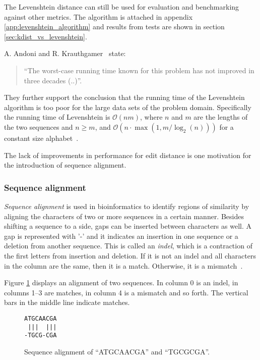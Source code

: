 The Levenshtein distance can still be used for evaluation and benchmarking
against other metrics. The algorithm is attached in appendix
\ref{app:levenshtein_algorithm} and results from tests are shown in section
\ref{sec:kdist_vs_levenshtein}.

A. Andoni and R. Krauthgamer~\cite[pp.~1--2]{andoni} state:
\begin{quote}
  ``The worst-case running time known for this problem has not improved in
  three decades (..)''.
\end{quote}
They further support the conclusion that the running time of the Levenshtein
algorithm is too poor for the large data sets of the problem domain.
Specifically the running time of Levenshtein is $\mathcal{O}(nm)$, where $n$
and $m$ are the lengths of the two sequences and $n\geq m$, and $\mathcal{O}(n
\cdot \max{(1,m/\log_2(n))})$ for a constant size alphabet~\cite{masek}.

The lack of improvements in performance for edit distance is one motivation
for the introduction of sequence alignment.


\subsubsection{Sequence alignment}

\emph{Sequence alignment} is used in bioinformatics to identify regions of
similarity by aligning the characters of two or more sequences in a certain
manner. Besides shifting a sequence to a side, gaps can be inserted between
characters as well. A gap is represented with '-' and it indicates an insertion
in one sequence or a deletion from another sequence. This is called an
\emph{indel}, which is a contraction of the first letters from insertion and
deletion. If it is not an indel and all characters in the column are the same,
then it is a match. Otherwise, it is a mismatch~\cite[pp.~135--136]{dong}.

Figure \ref{fig:seq_alignment} displays an alignment of two sequences. In
column 0 is an indel, in columns 1--3 are matches, in column
4 is a mismatch and so forth. The vertical bars in the middle
line indicate matches.

\begin{figure}[H]
  \centering
  \verb+ATGCAACGA+ \\
  \verb+ |||  |||+ \\
  \verb+-TGCG-CGA+
  \caption{Sequence alignment of ``ATGCAACGA'' and ``TGCGCGA''.}
  \label{fig:seq_alignment}
\end{figure}

